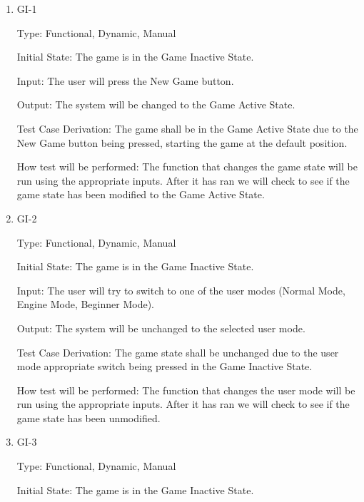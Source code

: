 \documentclass[12pt, titlepage]{article}
\begin{document}
  \begin{enumerate}
  
    \item{GI-1\\}
  
    Type: Functional, Dynamic, Manual
                        
    Initial State: The game is in the Game Inactive State.
                        
    Input: The user will press the New Game button.
                        
    Output: The system will be changed to the Game Active State.
                        
    Test Case Derivation: The game shall be in the Game Active State due to the New Game button being pressed,
    starting the game at the default position.
    
    How test will be performed: The function that changes the game state will be run using the appropriate inputs.
    After it has ran we will check to see if the game state has been modified to the Game Active State.
  
    \item{GI-2\\}
  
    Type: Functional, Dynamic, Manual
                        
    Initial State: The game is in the Game Inactive State.
                        
    Input: The user will  try to switch to one of the user modes (Normal Mode, Engine Mode, Beginner Mode).
    
    Output: The system will be unchanged to the selected user mode.
                        
    Test Case Derivation: The game state shall be unchanged due to the user mode appropriate switch being pressed in the Game Inactive State.
    
    How test will be performed: The function that changes the user mode will be run using the appropriate inputs.
    After it has ran we will check to see if the game state has been unmodified.
  
    \item{GI-3\\}
  
    Type: Functional, Dynamic, Manual
                        
    Initial State: The game is in the Game Inactive State.
                        

\end{enumerate}
\end{document}
